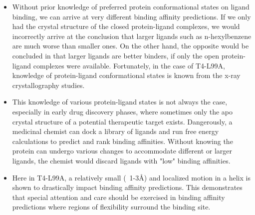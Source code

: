\documentclass{article}
\begin{document}
\begin{itemize}
   \item Without prior knowledge of preferred protein conformational states on ligand binding, we can arrive at very different binding affinity predictions.
      If we only had the crystal structure of the closed protein-ligand complexes, we would incorrectly arrive at the conclusion that larger ligands such as n-hexylbenzene are much worse than smaller ones.
      On the other hand, the opposite would be concluded in that larger ligands are better binders, if only the open protein-ligand complexes were available.
      Fortunately, in the case of T4-L99A, knowledge of protein-ligand conformational states is known from the x-ray crystallography studies. \cite{Merski2015}
   \item This knowledge of various protein-ligand states is not always the case, especially in early drug discovery phases, where sometimes only the apo crystal structure of a potential therapeutic target exists.
      Dangerously, a medicinal chemist can dock a library of ligands and run free energy calculations to predict and rank binding affinities.
      Without knowing the protein can undergo various changes to accommodate different or larger ligands, the chemist would discard ligands with "low" binding affinities.
   \item Here in T4-L99A, a relatively small (~1-3\AA) and localized motion in a helix is shown to drastically impact binding affinity predictions.
      This demonstrates that special attention and care should be exercised in binding affinity predictions where regions of flexibility surround the binding site.
   \end{itemize}
      
\end{document}
